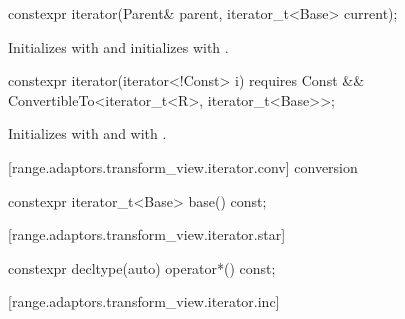 {
\begin{itemdecl}
constexpr iterator(Parent& parent, iterator_t<Base> current);
\end{itemdecl}

\begin{itemdescr}
\pnum
\effects Initializes  with  and
initializes  with .
\end{itemdescr}

%
\begin{itemdecl}
constexpr iterator(iterator<!Const> i)
  requires Const && ConvertibleTo<iterator_t<R>, iterator_t<Base>>;
\end{itemdecl}

\begin{itemdescr}
\pnum
\effects Initializes  with  and 
with .
\end{itemdescr}

[range.adaptors.transform_view.iterator.conv]{ conversion}

\begin{itemdecl}
constexpr iterator_t<Base> base() const;
\end{itemdecl}

\begin{itemdescr}
\pnum
\oldtxt{\returns}  
\end{itemdescr}

[range.adaptors.transform_view.iterator.star]{}

\begin{itemdecl}
constexpr decltype(auto) operator*() const;
\end{itemdecl}

\begin{itemdescr}
\pnum
\oldtxt{\returns} 
\end{itemdescr}

[range.adaptors.transform_view.iterator.inc]{}

}
